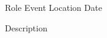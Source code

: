 

\begin{cventries}

  \cventry
    {Role} %
    {Event} %
    {Location} %
    {Date} %
    {
      \begin{cvitems} %
        \item {Description}
      \end{cvitems}
    }

\end{cventries}
